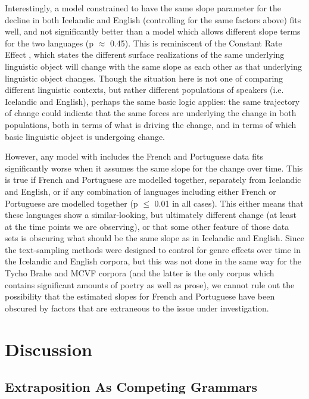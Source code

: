 Interestingly, a model constrained to have the same slope parameter for the decline in both Icelandic and English (controlling for the same factors above) fits well, and not significantly better than a model which allows different slope terms for the two languages (p $\approx$ 0.45). This is reminiscent of the Constant Rate Effect \citep[][among others]{kroch1989, pintzuk1991, santorini1993a}, which states the different surface realizations of the same underlying linguistic object will change with the same slope as each other as that underlying linguistic object changes. Though the situation here is not one of comparing different linguistic contexts, but rather different populations of speakers (i.e. Icelandic and English), perhaps the same basic logic applies: the same trajectory of change could indicate that the same forces are underlying the change in both populations, both in terms of what is driving the change, and in terms of which basic linguistic object is undergoing change. 

However, any model with includes the French and Portuguese data fits significantly worse when it assumes the same slope for the change over time. This is true if French and Portuguese are modelled together, separately from Icelandic and English, or if any combination of languages including either French or Portuguese are modelled together (p $\leq$ 0.01 in all cases). This either means that these languages show a similar-looking, but ultimately different change (at least at the time points we are observing), or that some other feature of those data sets is obscuring what should be the same slope as in Icelandic and English. Since the text-sampling methods were designed to control for genre effects over time in the Icelandic and English corpora, but this was not done in the same way for the Tycho Brahe and MCVF corpora (and the latter is the only corpus which contains significant amounts of poetry as well as prose), we cannot rule out the possibility that the estimated slopes for French and Portuguese have been obscured by factors that are extraneous to the issue under investigation.



\section{Discussion}
\subsection{Extraposition As Competing Grammars}
\label{compete}

